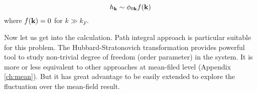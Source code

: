 \begin{equation}\label{eq:pathInt2:hphif}
h_{\mathbf{k}}\sim\phi_{0\mathbf{k}}f(\mathbf{k})
\end{equation}
 where $f(\mathbf{k})=0$ for $k\gg{k_{F}}$.  

%
% 
%

Now let us get into the  calculation.  Path integral approach is particular suitable for this problem.   The Hubbard-Stratonovich transformation provides powerful tool to study non-trivial degree of freedom (order parameter) in the system.  It is more or less equivalent to other approaches at mean-filed level (Appendix \ref{ch:mean}). But it has great advantage to be easily extended to explore the fluctuation over the mean-field result.  

